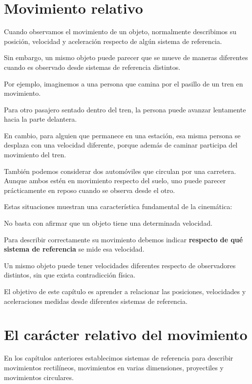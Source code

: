﻿\section{Movimiento relativo}

Cuando observamos el movimiento de un objeto, normalmente describimos
su posición, velocidad y aceleración respecto de algún sistema de
referencia.

Sin embargo, un mismo objeto puede parecer que se mueve de maneras
diferentes cuando es observado desde sistemas de referencia distintos.

Por ejemplo, imaginemos a una persona que camina por el pasillo de un
tren en movimiento.

Para otro pasajero sentado dentro del tren, la persona puede avanzar
lentamente hacia la parte delantera.

En cambio, para alguien que permanece en una estación, esa misma
persona se desplaza con una velocidad diferente, porque además de
caminar participa del movimiento del tren.

También podemos considerar dos automóviles que circulan por una
carretera. Aunque ambos estén en movimiento respecto del suelo,
uno puede parecer prácticamente en reposo cuando se observa desde
el otro.

Estas situaciones muestran una característica fundamental de la
cinemática:

\begin{idea}

No basta con afirmar que un objeto tiene una determinada velocidad.

Para describir correctamente su movimiento debemos indicar
\textbf{respecto de qué sistema de referencia} se mide esa velocidad.

Un mismo objeto puede tener velocidades diferentes respecto de
observadores distintos, sin que exista contradicción física.

\end{idea}

El objetivo de este capítulo es aprender a relacionar las posiciones,
velocidades y aceleraciones medidas desde diferentes sistemas de
referencia.


\section{El carácter relativo del movimiento}

En los capítulos anteriores establecimos sistemas de referencia para
describir movimientos rectilíneos, movimientos en varias dimensiones,
proyectiles y movimientos circulares.

